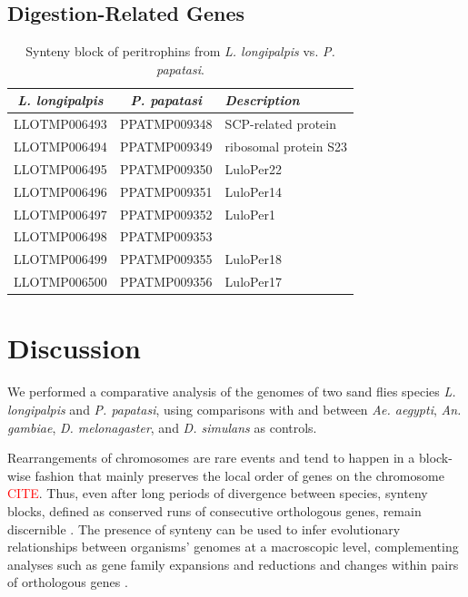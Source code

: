 \subsection{Digestion-Related Genes}



\begin{table}[H]
  \centering
  \begin{tabular}{c c l} \hline
    \emph{L. longipalpis} & \emph{P. papatasi} & \emph{Description} \\ \hline
    LLOTMP006493 & PPATMP009348 & SCP-related protein \\
    LLOTMP006494 & PPATMP009349 & ribosomal protein S23 \\
    LLOTMP006495 & PPATMP009350 & LuloPer22 \\
    LLOTMP006496 & PPATMP009351 & LuloPer14 \\
    LLOTMP006497 & PPATMP009352 & LuloPer1 \\
    LLOTMP006498 & PPATMP009353 &  \\
    LLOTMP006499 & PPATMP009355 & LuloPer18 \\
    LLOTMP006500 & PPATMP009356 & LuloPer17
  \end{tabular}
  \caption{Synteny block of peritrophins from \emph{L. longipalpis} vs. \emph{P. papatasi}.}
  \label{tab:synteny-llot-ppat-peritrophic}
\end{table}


\section{Discussion}
We performed a comparative analysis of the genomes of two sand flies species \emph{L. longipalpis} and \emph{P. papatasi}, using comparisons with and between \emph{Ae. aegypti}, \emph{An. gambiae}, \emph{D. melonagaster}, and \emph{D. simulans} as controls.


Rearrangements of chromosomes are rare events and tend to happen in a block-wise fashion that mainly preserves the local order of genes on the chromosome \textcolor{red}{CITE}. Thus, even after long periods of divergence between species, synteny blocks, defined as conserved runs of consecutive orthologous genes, remain discernible \cite{Heger2007}.  The presence of synteny can be used to infer evolutionary relationships between organisms' genomes at a macroscopic level, complementing analyses such as gene family expansions and reductions and changes within pairs of orthologous genes \cite{Zdobnov2002,Zdobnov2007}.

